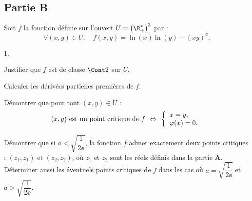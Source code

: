 \subsection*{Partie B}
\noindent
Soit $f$ la fonction définie sur l'ouvert $U=\left(\R_+^*\right)^2$
par :
\[
\forall (x,y)\in U, \quad f(x,y)=\ln(x)\ln(y)-(xy)^a.
\]
\begin{noliste}{1.}
  \setcounter{enumi}{3}
\item Justifier que $f$ est de classe $\Cont 2$ sur $U$.
  
  
  
\item Calculer les dérivées partielles premières de $f$.
  
  
  
  
  
   
\item Démontrer que pour tout $(x,y)\in U$ :
  \[
  \mbox{$(x,y)$ est un point critique de $f$ \ $\Leftrightarrow$ \
    $\left\{ \begin{array}{l}
        x=y,\\
        \varphi(x)=0.
      \end{array}\right.$}
  \]
  
  
  
\item Démontrer que si $a<\sqrt{\dfrac{1}{2\ee}}$, la fonction $f$
  admet exactement deux points critiques : $(z_1,z_1)$ et $(z_2,z_2)$,
  où $z_1$ et $z_2$ sont les réels définis dans la partie {\bf A}.\\
  Déterminer aussi les éventuels points critiques de $f$ dans les cas
  où $a=\sqrt{\dfrac{1}{2\ee}}$ et $a>\sqrt{\dfrac{1}{2\ee}}$.\\[-.6cm]


\end{noliste}

